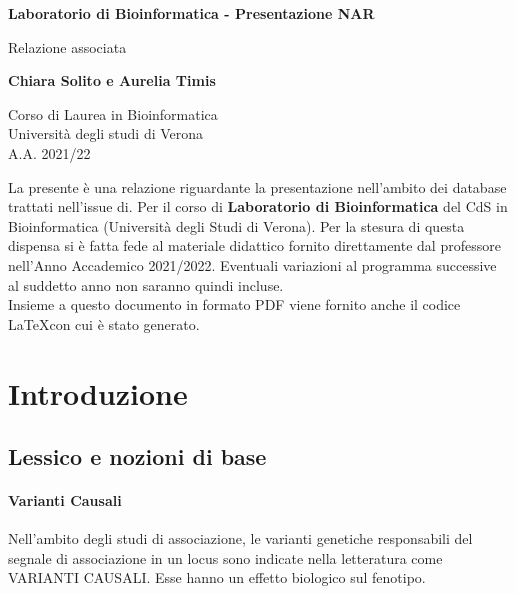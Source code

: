 \documentclass{article}
\begin{document}
\newcommand\tab[1][0.3cm]{\hspace*{#1}}


\begin{titlepage}
    \begin{center}
        \vspace*{1cm}
            
        \Huge
        \textbf{Laboratorio di Bioinformatica - Presentazione NAR}
            
        \vspace{0.5cm}
        \LARGE
        Relazione associata
            
        \vspace{1.5cm}
            
        \textbf{Chiara Solito e Aurelia Timis}

        \vspace{0.8cm}

            
        \Large
        Corso di Laurea in Bioinformatica\\
        Università degli studi di Verona\\
        A.A. 2021/22
            
    \end{center}
\end{titlepage}
La presente è una relazione riguardante la presentazione nell'ambito dei database trattati nell'issue di. Per il corso di \textbf{Laboratorio di Bioinformatica} del CdS in Bioinformatica (Università degli Studi di Verona). Per la stesura di questa dispensa si è fatta fede al materiale didattico fornito direttamente dal professore nell'Anno Accademico 2021/2022. Eventuali variazioni al programma successive al suddetto anno non saranno quindi incluse.\\
Insieme a questo documento in formato PDF viene fornito anche il codice \LaTeX  con cui è stato generato.
\tableofcontents
\thispagestyle{empty}
\newpage
\thispagestyle{empty}
\section{Introduzione}
\subsection{Lessico e nozioni di base}
\paragraph{Varianti Causali}Nell'ambito degli studi di associazione, le varianti genetiche responsabili del segnale di associazione in un locus sono indicate nella letteratura come VARIANTI CAUSALI. Esse hanno un effetto biologico sul fenotipo.
\end{document}
